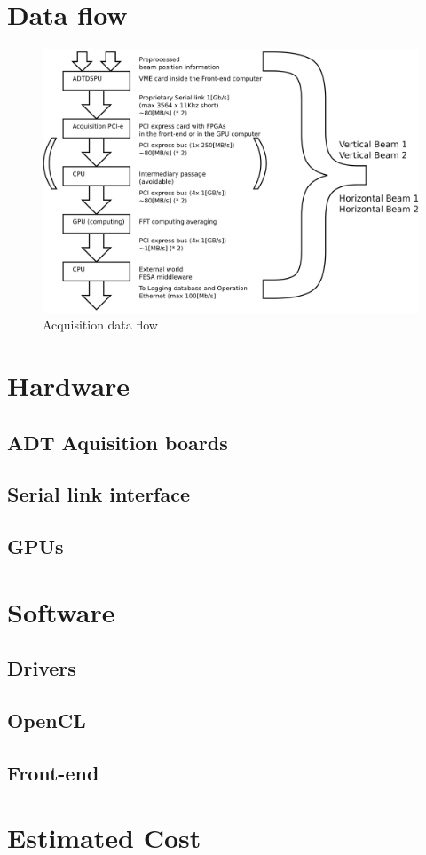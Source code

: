 \section{Data flow}

\begin{figure}[H]
\caption{Acquisition data flow}
\centering
\includegraphics[scale=0.3]{dataflow.pdf}
\end{figure}

\section{Hardware}

	\subsection{ADT Aquisition boards}

	\subsection{Serial link interface}

	\subsection{GPUs}

\section{Software}

	\subsection{Drivers}

	\subsection{OpenCL}

	\subsection{Front-end}

\section{Estimated Cost}